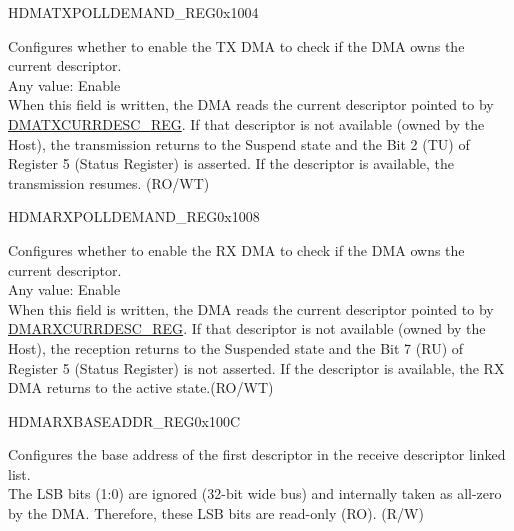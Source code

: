 \begin{register}{H}{DMATXPOLLDEMAND\_REG}{0x1004}\label{regdesc:DMATXPOLLDEMANDREG}
%
\regnewline%
\begin{regdesc}\begin{reglist}
\item [TRANS\_POLL\_DEMAND] Configures whether to enable the TX DMA to check if the DMA owns the current descriptor. \\
Any value: Enable\\
When this field is written, the DMA reads the current descriptor pointed to by \hyperref[regdesc:DMATXCURRDESCREG]{DMATXCURRDESC\_REG}. If that descriptor is not available (owned by the Host), the transmission returns to the Suspend state and the Bit 2 (TU) of Register 5 (Status Register) is asserted. If the descriptor is available, the transmission resumes. (RO/WT)
\end{reglist}\end{regdesc}
\end{register}


\begin{register}{H}{DMARXPOLLDEMAND\_REG}{0x1008}\label{regdesc:DMARXPOLLDEMANDREG}
%
\regnewline%
\begin{regdesc}\begin{reglist}
\item [RECV\_POLL\_DEMAND] Configures whether to enable the RX DMA to check if the DMA owns the current descriptor. \\
Any value: Enable\\
When this field is written, the DMA reads the current descriptor pointed to by \hyperref[regdesc:DMARXCURRDESCREG]{DMARXCURRDESC\_REG}. If that descriptor is not available (owned by the Host), the reception returns to the Suspended state and the Bit 7 (RU) of Register 5 (Status Register) is not asserted. If the descriptor is available, the RX DMA returns to the active state.(RO/WT)
\end{reglist}\end{regdesc}
\end{register}


\begin{register}{H}{DMARXBASEADDR\_REG}{0x100C}\label{regdesc:DMARXBASEADDRREG}
%
\regnewline%
\begin{regdesc}\begin{reglist}
\item [START\_RECV\_LIST] Configures the base address of the first descriptor in the receive descriptor linked list.\\ The LSB bits (1:0) are ignored (32-bit wide bus) and internally taken as all-zero by the DMA. Therefore, these LSB bits are read-only (RO). (R/W)
\end{reglist}\end{regdesc}
\end{register}


